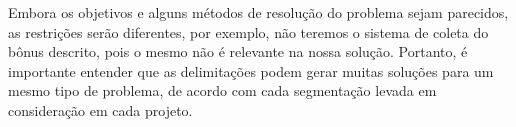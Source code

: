 Embora os objetivos e alguns métodos de resolução do problema sejam parecidos, as restrições serão diferentes, por exemplo, não teremos o sistema de coleta do bônus descrito, pois o mesmo não é relevante na nossa solução. Portanto, é importante entender que as delimitações podem gerar muitas soluções para um mesmo tipo de problema, de acordo com cada segmentação levada em consideração em cada projeto.

